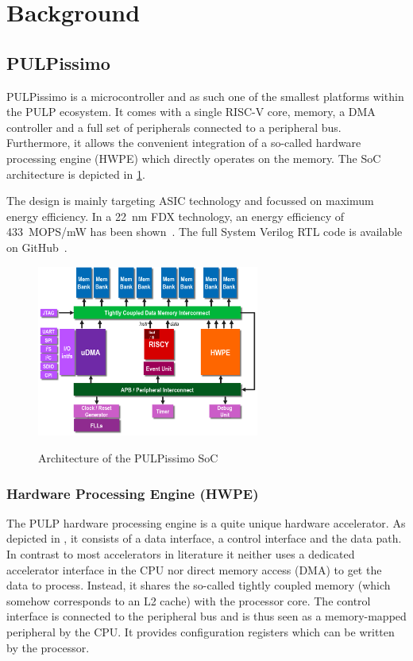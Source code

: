 \documentclass[a4paper, 12pt]{article}
\begin{document}
\section{Background} \label{sec:background}

\subsection{PULPissimo}

PULPissimo is a microcontroller and as such one of the smallest platforms within the PULP ecosystem. It comes with a single RISC-V core, memory, a DMA controller and a full set of peripherals connected to a peripheral bus. Furthermore, it allows the convenient integration of a so-called hardware processing engine (HWPE) which directly operates on the memory. The SoC architecture is depicted in \cref{pulpissimo-arch}.

The design is mainly targeting ASIC technology and focussed on maximum energy efficiency. In a \SI{22}{nm} FDX technology, an energy efficiency of \SI{433}{MOPS/mW} has been shown~\cite{Schiavone2018}. The full System Verilog RTL code is available on GitHub~\cite{pulpissimo}.

\begin{figure}
	\centering
	\includegraphics[width=0.65\textwidth]{pulpissimo_arch.png}
	\label{pulpissimo-arch}
	\caption{Architecture of the PULPissimo SoC \cite{pulpissimo}}
\end{figure}

\subsubsection*{Hardware Processing Engine (HWPE)}

The PULP hardware processing engine is a quite unique hardware accelerator. As depicted in , it consists of a data interface, a control interface and the data path. In contrast to most accelerators in literature it neither uses a dedicated accelerator interface in the CPU nor direct memory access (DMA) to get the data to process. Instead, it shares the so-called tightly coupled memory (which somehow corresponds to an L2 cache) with the processor core. The control interface is connected to the peripheral bus and is thus seen as a memory-mapped peripheral by the CPU. It provides configuration registers which can be written by the processor.
\end{document}
